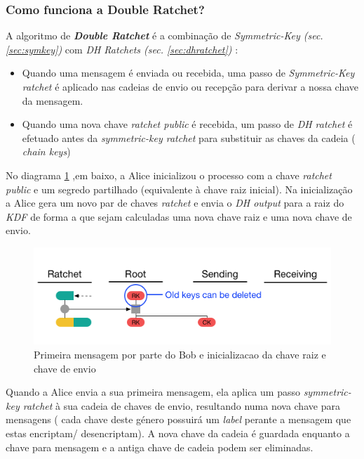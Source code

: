 \subsubsection{Como funciona a Double Ratchet?}
A algoritmo de \textit{\textbf{Double Ratchet}} é a combinação de \textit{Symmetric-Key (sec.\ref{sec:symkey})} com \textit{DH Ratchets (sec. \ref{sec:dhratchet})} :

\begin{itemize}
    \item Quando uma mensagem é enviada ou recebida, uma passo de \textit{Symmetric-Key ratchet} é aplicado nas cadeias de envio ou recepção para derivar a nossa chave da mensagem.
    \item Quando uma nova chave \textit{ratchet public} é recebida, um passo de \textit{DH ratchet} é efetuado antes da \textit{symmetric-key ratchet} para substituir as chaves da cadeia ( \textit{chain keys})
\end{itemize}

No diagrama \ref{diagram:DR1} ,em baixo, a Alice inicializou o processo com a chave \textit{ratchet public} e um segredo partilhado (equivalente à chave raiz inicial). Na inicialização a Alice gera um novo par de chaves \textit{ratchet} e envia o \textit{DH output} para a raiz do \textit{KDF} de forma a que sejam calculadas uma nova chave raiz e uma nova chave de envio.

\begin{figure}[H]
\begin{center}
\includegraphics[width=12cm]{img/DR1.png}
\caption{Primeira mensagem por parte do Bob e inicializacao da chave raiz e chave de envio}
\label{diagram:DR1}
\centering
\end{center}
\end{figure}

Quando a Alice envia a sua primeira mensagem, ela aplica um passo \textit{symmetric-key ratchet} à sua cadeia de chaves de envio, resultando numa nova chave para mensagens ( cada chave deste género possuirá um \textit{label} perante a mensagem que estas encriptam/ desencriptam). A nova chave da cadeia é guardada enquanto a chave para mensagem e a antiga chave de cadeia podem ser eliminadas.

